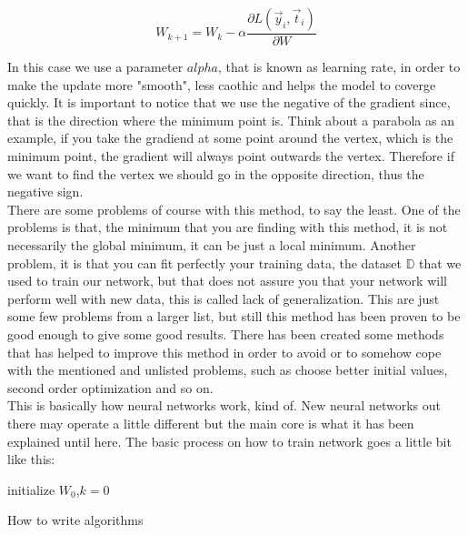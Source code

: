 \documentclass[english,preprint,JIP]{ipsj}
\begin{document}
\begin{equation}
    W_{k+1} = W_{k} - \alpha \frac{\partial L(\vec{y}_i,\vec{t}_i)}{\partial W}
\end{equation}

In this case we use a parameter $alpha$, that is known as learning rate, in
order to make the update more "smooth", less caothic and helps the model to
coverge quickly. It is important to notice that we use the negative of the
gradient since, that is the direction where the minimum point is. Think about a
parabola as an example, if you take the gradiend at some point around the
vertex, which is the minimum point, the gradient will always point outwards the
vertex. Therefore if we want to find the vertex we should go in the opposite
direction, thus the negative sign.\\

There are some problems of course with this method, to say the least. One of the
problems is that, the minimum that you are finding with this method, it is not
necessarily the global minimum, it can be just a local minimum. Another problem,
it is that you can fit perfectly your training data, the dataset $\mathbb{D}$
that we used to train our network, but that does not assure you that your
network will perform well with new data, this is called lack of generalization.
This are just some few problems from a larger list, but still this method has
been proven to be good enough to give some good results. There has been created
some methods that has helped to improve this method in order to avoid or to
somehow cope with the mentioned and unlisted problems, such as choose better
initial values, second order optimization and so on.\\

This is basically how neural networks work, kind of. New neural networks out
there may operate a little different but the main core is what it has been
explained until here. The basic process on how to train network goes a little bit like this:

\begin{algorithm}
    initialize $W_0$,$k=0$\;
    \caption{How to write algorithms}
\end{algorithm}
\end{document}
